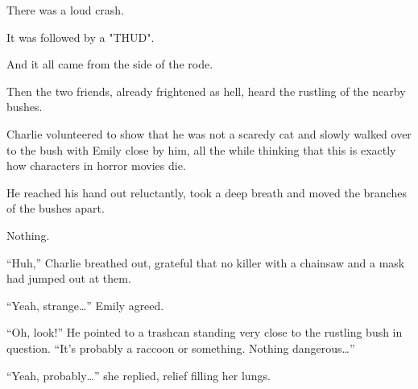 There was a loud crash.

It was followed by a "THUD".

And it all came from the side of the rode.

Then the two friends, already frightened as hell, heard the rustling of the nearby bushes.

Charlie volunteered to show that he was not a scaredy cat and slowly walked over to the bush with Emily close by him, all the while thinking that this is exactly how characters in horror movies die.

He reached his hand out reluctantly, took a deep breath and moved the branches of the bushes apart.

Nothing.

“Huh,” Charlie breathed out, grateful that no killer with a chainsaw and a mask had jumped out at them.

“Yeah, strange…” Emily agreed.

“Oh, look!” He pointed to a trashcan standing very close to the rustling bush in question. “It's probably a raccoon or something. Nothing dangerous…”

“Yeah, probably…” she replied, relief filling her lungs.
